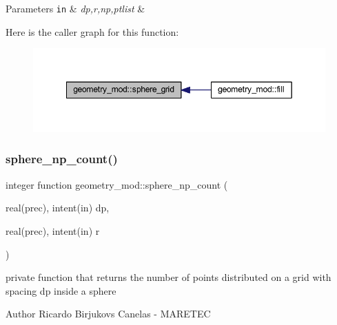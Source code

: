 \begin{DoxyParams}[1]{Parameters}
\mbox{\tt in}  & {\em dp,r,np,ptlist} & \\
\hline
\end{DoxyParams}
Here is the caller graph for this function\+:\nopagebreak
\begin{figure}[H]
\begin{center}
\leavevmode
\includegraphics[width=349pt]{namespacegeometry__mod_a6c03a4ea3de6763940396dbeb3908ebc_icgraph}
\end{center}
\end{figure}
\mbox{\label{namespacegeometry__mod_a05de7940b4e7df5a2b31f3d0414e3743}} 
\subsubsection{\texorpdfstring{sphere\+\_\+np\+\_\+count()}{sphere\_np\_count()}}
{\footnotesize\ttfamily integer function geometry\+\_\+mod\+::sphere\+\_\+np\+\_\+count (\begin{DoxyParamCaption}\item[{real(prec), intent(in)}]{dp,  }\item[{real(prec), intent(in)}]{r }\end{DoxyParamCaption})\hspace{0.3cm}{\ttfamily [private]}}



private function that returns the number of points distributed on a grid with spacing dp inside a sphere 

\begin{DoxyAuthor}{Author}
Ricardo Birjukovs Canelas -\/ M\+A\+R\+E\+T\+EC 
\end{DoxyAuthor}

